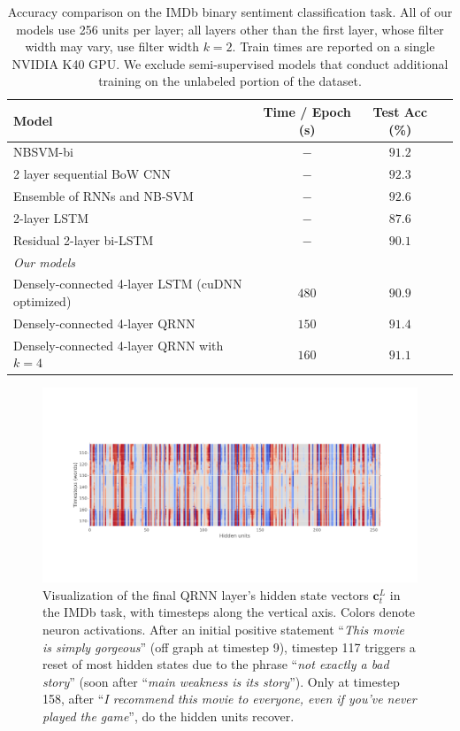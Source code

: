 \documentclass{article} %
\begin{document}
\begin{table}
\center
\begin{tabular}{l|ccc}
\toprule
\bf Model & \bf Time / Epoch (s) & \bf Test Acc (\%) \\
\midrule
NBSVM-bi \citep{Wang2012} & $-$ & $91.2$\\
2 layer sequential BoW CNN \citep{Johnson2014} & $-$ & $92.3$ \\
Ensemble of RNNs and NB-SVM \citep{Mesnil2014} & $-$ & $92.6$ \\
2-layer LSTM \citep{Longpre2016} & $-$ & $87.6$ \\
Residual 2-layer bi-LSTM \citep{Longpre2016} & $-$ & $90.1$ \\
\midrule
{\it Our models}\\
Densely-connected 4-layer LSTM (cuDNN optimized) & $480$ & $90.9$ \\
Densely-connected 4-layer QRNN & $150$ & $91.4$ \\
Densely-connected 4-layer QRNN with $k=4$ & $160$ & $91.1$ \\
\bottomrule
\end{tabular}
\caption{
Accuracy comparison on the IMDb binary sentiment classification task. All of our models use 256 units per layer; all layers other than the first layer, whose filter width may vary, use filter width $k=2$. Train times are reported on a single NVIDIA K40 GPU. We exclude semi-supervised models that conduct additional training on the unlabeled portion of the dataset.
}
\label{table:IMDb}
\end{table}

\begin{figure}
\centering
\includegraphics[width=.99\linewidth]{test_batch512_ex0_ff7.pdf}
\caption{Visualization of the final QRNN layer's hidden state vectors $\mathbf{c}^L_t$ in the IMDb task, with timesteps along the vertical axis. Colors denote neuron activations.
After an initial positive statement ``\textit{This movie is simply gorgeous}'' (off graph at timestep 9), timestep 117 triggers a reset of most hidden states due to the phrase ``\textit{not exactly a bad story}'' (soon after ``\textit{main weakness is its story}'').
Only at timestep 158, after ``\textit{I recommend this movie to everyone, even if you've never played the game}'', do the hidden units recover.}
\label{fig:IMDBviz}
\end{figure}
\end{document}
